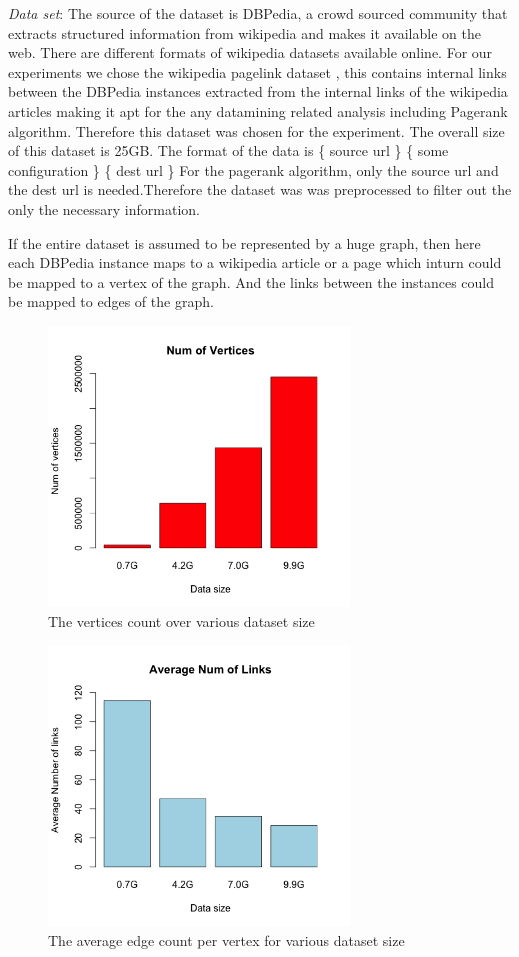 \documentclass{article}
\begin{document}
\emph{Data set}:
The source of the dataset is DBPedia, a crowd sourced community that extracts structured information from wikipedia and makes it available on the web. \citep{[??]} There are different formats of wikipedia datasets available online. For our experiments we chose the wikipedia pagelink dataset \citep{[??]} , this contains
internal links between the DBPedia instances extracted from the internal links of the wikipedia articles making it apt for the any datamining related analysis including Pagerank algorithm. Therefore this dataset was chosen for the experiment.
The overall size of this dataset is 25GB.
The format of the data is \{ source url \} \{ some configuration \} \{ dest url \}
For the pagerank algorithm, only the source url and the dest url is needed.Therefore the dataset was was preprocessed to filter out the only the necessary information.

If the entire dataset is assumed to be represented by a huge graph, then here each DBPedia instance maps to a wikipedia article or a page which inturn could be mapped to a vertex of the graph. And the links between the instances could be mapped to  
edges of the graph.


\begin{figure}
\centering
  \includegraphics[width=80mm]{images/numVertices.png}
  \caption{The vertices count over various dataset size}
  \label{fig:numvertices}
\end{figure}

\begin{figure} 
  \centering
  \includegraphics[width=80mm]{images/numLinks.png}
  \caption{The average edge count per vertex for various dataset size}
  \label{fig:numlinks}
\end{figure}
\end{document}
